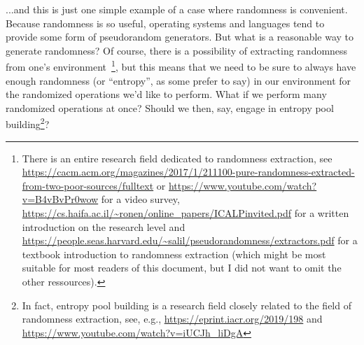 \documentclass[a4paper,table,dvipsnames]{article}
\theoremstyle{definition}
\begin{document}
...and this is just one simple example of a case where randomness is convenient.
Because randomness is so useful, operating systems and languages tend to
provide some form of pseudorandom generators. But what is a reasonable way
to generate randomness? Of course, there is a possibility of extracting randomness
from one's environment~\footnote{There is an entire research field dedicated to
randomness extraction, see \url{https://cacm.acm.org/magazines/2017/1/211100-pure-randomness-extracted-from-two-poor-sources/fulltext}
or \url{https://www.youtube.com/watch?v=B4vBvPr0wow} for a video survey, \url{https://cs.haifa.ac.il/~ronen/online_papers/ICALPinvited.pdf}
for a written introduction on the research level and \url{https://people.seas.harvard.edu/~salil/pseudorandomness/extractors.pdf} for
a textbook introduction to randomness extraction (which might be most suitable for most readers of this document, but I did not want to omit the other ressources).}, but this means that we need to be sure to always have
enough randomness (or ``entropy'', as some prefer to say) in our environment
for the randomized operations we'd like to perform. What if we perform many
randomized operations at once? Should we then, say, engage in entropy pool
building\footnote{In fact, entropy pool building is a research field closely
related to the field of randomness extraction, see, e.g., \url{https://eprint.iacr.org/2019/198}
and \url{https://www.youtube.com/watch?v=iUCJh_liDgA}}?
\end{document}
